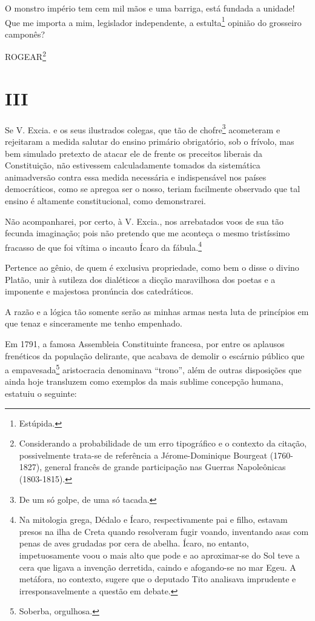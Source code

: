 \asterisc{}

O monstro império tem cem mil mãos e uma barriga, está fundada a
unidade! Que me importa a mim, legislador independente, a
estulta\footnote{Estúpida.} opinião do grosseiro camponês?

ROGEAR\footnote{Considerando a probabilidade de um erro tipográfico e
  o contexto da citação, possivelmente trata-se de referência a
  Jérome-Dominique Bourgeat (1760-1827), general francês de grande
  participação nas Guerras Napoleônicas (1803-1815).}

\section{III}

Se V. Excia. e os seus ilustrados colegas, que tão de chofre\footnote{
  De um só golpe, de uma só tacada.} acometeram e rejeitaram a medida
salutar do ensino primário obrigatório, sob o frívolo, mas bem simulado
pretexto de atacar ele de frente os preceitos liberais da Constituição,
não estivessem calculadamente tomados da sistemática animadversão contra
essa medida necessária e indispensável nos países democráticos, como se
apregoa ser o nosso, teriam facilmente observado que tal ensino é
altamente constitucional, como demonstrarei.

Não acompanharei, por certo, à V. Excia., nos arrebatados voos de sua
tão fecunda imaginação; pois não pretendo que me aconteça o mesmo
tristíssimo fracasso de que foi vítima o incauto Ícaro da
fábula.\footnote{Na mitologia grega, Dédalo e Ícaro, respectivamente
  pai e filho, estavam presos na ilha de Creta quando resolveram fugir
  voando, inventando asas com penas de aves grudadas por cera de abelha.
  Ícaro, no entanto, impetuosamente voou o mais alto que pode e ao
  aproximar-se do Sol teve a cera que ligava a invenção derretida,
  caindo e afogando-se no mar Egeu. A metáfora, no contexto, sugere que
  o deputado Tito analisava imprudente e irresponsavelmente a questão em
  debate.}

Pertence ao gênio, de quem é exclusiva propriedade, como bem o disse o
divino Platão, unir à sutileza dos dialéticos a dicção maravilhosa dos
poetas e a imponente e majestosa pronúncia dos catedráticos.

A razão e a lógica tão somente serão as minhas armas nesta luta de
princípios em que tenaz e sinceramente me tenho empenhado.

Em 1791, a famosa Assembleia Constituinte francesa, por entre os
aplausos frenéticos da população delirante, que acabava de demolir o
escárnio público que a empavesada\footnote{Soberba, orgulhosa.}
aristocracia denominava ``trono'', além de outras disposições que ainda
hoje transluzem como exemplos da mais sublime concepção humana, estatuiu
o seguinte:

